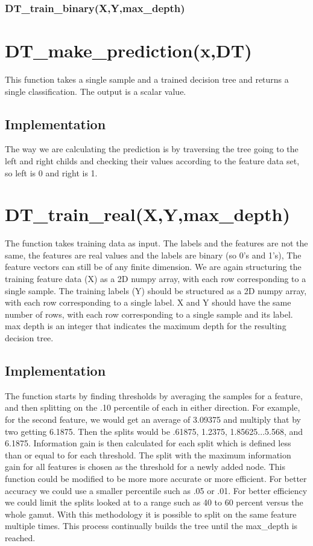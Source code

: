 \documentclass{article}
\begin{document}
\subsubsection{DT\_train\_binary(X,Y,max\_depth)}
\section{DT\_make\_prediction(x,DT)}
This function takes a single sample and a trained decision tree and returns a single classification.
The output is a scalar value. 
\subsection{Implementation}
The way we are calculating the prediction is by traversing the tree going to the left and right childs and checking their values according to the feature data set, so left is 0 and right is 1. 
\section{DT\_train\_real(X,Y,max\_depth)}
The function takes training data as input. The labels and the features are not the same, the features are real values and the labels are binary (so 0's and 1's), The feature vectors can still be of
any finite dimension. We are again structuring the training feature data (X) as a 2D numpy array, with each
row corresponding to a single sample. The training labels (Y) should be structured as a 2D numpy array,
with each row corresponding to a single label. X and Y should have the same number of rows, with each row
corresponding to a single sample and its label. max depth is an integer that indicates the maximum depth
for the resulting decision tree. 
\subsection{Implementation}
The function starts by finding thresholds by averaging the samples for a feature, and then splitting on the .10 percentile of each in either direction. For example, for the second feature, we would get an average of 3.09375 and multiply that by two getting 6.1875. Then the splits would be .61875, 1.2375, 1.85625...5.568, and 6.1875. Information gain is then calculated for each split which is defined less than or equal to for each threshold. The split with the maximum information gain for all features is chosen as the threshold for a newly added node. This function could be modified to be more more accurate or more efficient. For better accuracy we could use a smaller percentile such as .05 or .01. For better efficiency we could limit the splits looked at to a range such as 40 to 60 percent versus the whole gamut. With this methodology it is possible to split on the same feature multiple times. This process continually builds the tree until the max\_depth is reached.
\end{document}
